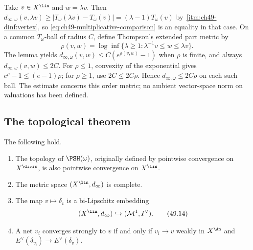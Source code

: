 \begin{remark}
\label{rem:ch49-comparison-sharp}
Take $v\in X^{\lin}$ and $w=\lambda v$.  Then
$d_{\infty,\omega}(v,\lambda v)\ge
|T_\omega(\lambda v)-T_\omega(v)|=(\lambda-1)T_\omega(v)$ by
\,\cref{itm:ch49-dinf:vertex}, so
\eqref{eq:ch49-multiplicative-comparison} is an equality in that case.  On a common $T_\omega$-ball of radius $C$, define Thompson's
extended part metric by
\[
 \rho(v,w)=\log\inf\{\lambda\ge1:\lambda^{-1}v\le w\le\lambda v\}.
\]
The lemma yields $d_{\infty,\omega}(v,w)\le C(e^{\rho(v,w)}-1)$
when $\rho$ is finite, and always $d_{\infty,\omega}(v,w)\le2C$.
For $\rho\le1$, convexity of the exponential gives
$e^\rho-1\le(e-1)\rho$; for $\rho\ge1$, use $2C\le2C\rho$.
Hence $d_{\infty,\omega}\le2C\rho$ on each such ball.
The estimate concerns this order metric; no ambient vector-space norm
on valuations has been defined.
\end{remark}

\subsection{The topological theorem}
\label{sec:ch49-topology-theorem}

\noindent\begin{minipage}{\linewidth}
\begin{theorem}\label{thm:bj-linear-topology-complete}
The following hold.

\begin{enumerate}
\item\label{itm:ch49-top:pointwise}
      The topology of $\PSH(\omega)$, originally defined by pointwise
      convergence on $X^{\divis}$, is also pointwise convergence on
      $X^{\lin}$.
\item\label{itm:ch49-top:complete}
      The metric space $(X^{\lin},d_\infty)$ is complete.
\item\label{itm:ch49-top:embedding}
      The map $v\mapsto\delta_v$ is a bi-Lipschitz embedding
\[
 (X^{\lin},d_\infty)\hookrightarrow(\mathcal M^1,I^\vee).
\tag{49.14}\label{eq:bj-valuations-measures-embedding}
\]
\item\label{itm:ch49-top:criterion}
      A net $v_i$ converges strongly to $v$ if and only if
      $v_i\to v$ weakly in $X^{\An}$ and
      $E^\vee(\delta_{v_i})\to E^\vee(\delta_v)$.
\end{enumerate}
\par
\end{theorem}
\end{minipage}\par

